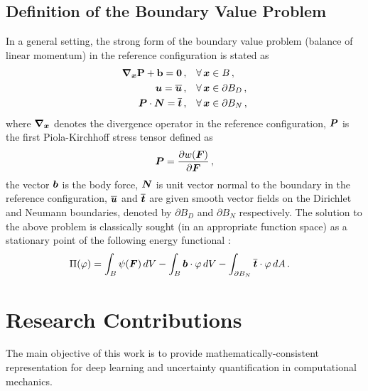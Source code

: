 \subsection{Definition of the Boundary Value Problem}\label{subsec:def-NBVP}

In a general setting, the strong form of the boundary value problem (balance of linear momentum) in the reference configuration is stated as \cite{wriggers2008nonlinear}
\begin{align}
    \boldsymbol{\nabla}_{\boldsymbol{x}} \bf{P} + \bf{b}  = {\bf{0}}\,,& \quad \forall\,\boldsymbol{x} \in {B}\,, \label{eq: stress divergence}\\
    \boldsymbol{u} = \overline{\boldsymbol{u}}\,,& \quad \forall\, \boldsymbol{x} \in \partial B_D\,,\\
    \boldsymbol{P} \cdot \boldsymbol{N} = \overline{\boldsymbol{t}}\,,& \quad \forall\, \boldsymbol{x} \in \partial B_N\,,
\end{align}
where $\boldsymbol{\nabla}_{\boldsymbol{x}}$ denotes the divergence operator in the reference configuration, $\boldsymbol{P}$ is the first Piola-Kirchhoff stress tensor defined as
\begin{equation}
    \boldsymbol{P} = \displaystyle{\frac{\partial w(\boldsymbol{F})}{\partial \boldsymbol{F}}}\,,
\end{equation}
the vector $\boldsymbol{b}$ is the body force, $\boldsymbol{N}$ is unit vector normal to the boundary in the reference configuration, $\overline{\boldsymbol{u}}$ and $\overline{\boldsymbol{t}}$ are given smooth vector fields on the Dirichlet and Neumann boundaries, denoted by $\partial B_D$ and $\partial B_N$ respectively. The solution to the above problem is classically sought (in an appropriate function space) as a stationary point of the following energy functional \cite{wriggers2008nonlinear}:
\begin{align}
    \Pi(\varphi) &= \int_B \psi(\boldsymbol{F}) \, dV - \int_{B} \boldsymbol{b} \cdot \varphi\,dV - \int_{\partial B_N} \overline{\boldsymbol{t}} \cdot \varphi\,dA\,.
\end{align}

\section{Research Contributions}

The main objective of this work is to provide mathematically-consistent representation for deep learning and uncertainty quantification in computational mechanics.

